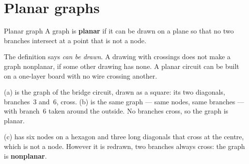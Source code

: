 \documentclass[11pt,a4paper]{article}
\newcommand{\gbranch}[4]{%
  \draw[gbr] (#1) -- (#2);
  \node[blab] at ($(#1)!0.5!(#2)!0.28cm!#3:(#2)$) {#4};}
\newcommand{\bridgecoords}{%
  \coordinate (n1) at (0,1.7);  \coordinate (n2) at (-1.5,0);
  \coordinate (n3) at (1.5,0);  \coordinate (n4) at (0,-1.7);}
\newcommand{\bridgenodes}{%
  \foreach \k/\pos in {1/above, 2/left, 3/right, 4/below}
    {\fill[metured] (n\k) circle (2.2pt); \node[nlab, \pos=3pt] at (n\k) {\k};}}
\newcommand{\bridgegraph}{%
  \gbranch{n1}{n2}{-90}{1}  \gbranch{n1}{n3}{90}{2}  \gbranch{n3}{n2}{-90}{3}
  \gbranch{n2}{n4}{-90}{4}  \gbranch{n3}{n4}{90}{5}
  \draw[gbr] (n4) to[out=180, in=180, looseness=2.3] (n1);
  \node[blab] at (-2.55,0) {6};
  \bridgenodes}
\newcommand{\squarekfour}{%
  \coordinate (s1) at (0,2); \coordinate (s3) at (2,2);
  \coordinate (s4) at (2,0); \coordinate (s2) at (0,0);
  \foreach \u/\v/\k/\lp in {s1/s2/1/left, s1/s3/2/above, s2/s4/4/below, s3/s4/5/right}
    \draw[black!75, thick] (\u) -- (\v) node[midway, \lp, blab] {\k};
  \draw[black!75, thick] (s3) -- (s2) node[pos=0.25, above left, blab, inner sep=1pt] {3};
  \draw[black!75, thick] (s4) -- (s1) node[pos=0.25, above right, blab, inner sep=1pt] {6};
  \foreach \k/\pos in {1/above left, 2/below left, 3/above right, 4/below right}
    {\fill[metured] (s\k) circle (2.2pt); \node[nlab, \pos=1pt] at (s\k) {\k};}}
\begin{document}
\section{Planar graphs}

\begin{definitionbox}{Planar graph}
A graph is \textbf{planar} if it can be drawn on a plane so that no two branches intersect
at a point that is not a node.
\end{definitionbox}

The definition says \emph{can be drawn}. A drawing with crossings does not make a graph
nonplanar, if some other drawing has none. A planar circuit can be built on a one-layer
board with no wire crossing another.

\begin{examplebox}
\begin{center}
\end{center}

(a) is the graph of the bridge circuit, drawn as a square: its two diagonals,
branches~3 and~6, cross. (b) is the same graph --- same nodes, same branches --- with
branch~6 taken around the outside. No branches cross, so the graph is planar.

(c) has six nodes on a hexagon and three long diagonals that cross at the centre, which is
not a node. However it is redrawn, two branches always cross: the graph is
\textbf{nonplanar}.
\end{examplebox}
\end{document}
